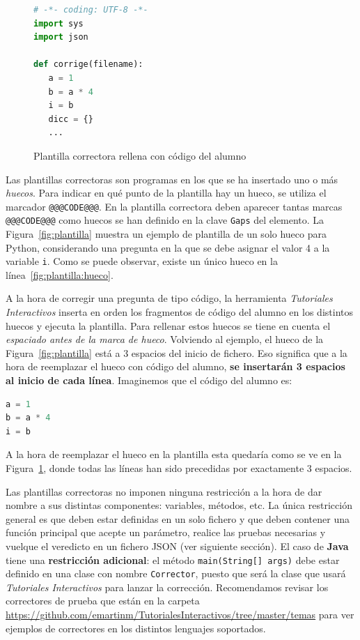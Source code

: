 \documentclass[]{article}
\newcommand{\code}[1]{{\lstinline[basicstyle=\ttfamily,mathescape]!#1!}}
\newcommand{\toolname}{\emph{Tutoriales Interactivos}}
\begin{document}
\begin{figure}[tb]
\begin{lstlisting}[language=Python,basicstyle=\ttfamily, otherkeywords={with}]
# -*- coding: UTF-8 -*-
import sys
import json
	
def corrige(filename):
   a = 1
   b = a * 4
   i = b
   dicc = {}
   ...
\end{lstlisting}	
\caption{Plantilla correctora rellena con código del alumno\label{fig:plantillaRellena}}
\end{figure}

Las plantillas correctoras son programas en los que se ha insertado uno o más \emph{huecos}. Para indicar en qué punto de la plantilla hay un hueco, se utiliza el marcador \code{@@@CODE@@@}. En la plantilla correctora deben aparecer tantas marcas \code{@@@CODE@@@} como huecos se han definido en la clave \code{Gaps} del elemento. La Figura~\ref{fig:plantilla} muestra un ejemplo de plantilla de un solo hueco para Python, considerando una pregunta en la que se debe asignar el valor 4 a la variable \code{i}. Como se puede observar, existe un único hueco en la línea~\ref{fig:plantilla:hueco}.

A la hora de corregir una pregunta de tipo código, la herramienta \toolname{} inserta en orden los fragmentos de código del alumno en los distintos huecos y ejecuta la plantilla. Para rellenar estos huecos se tiene en cuenta el \emph{espaciado antes de la marca de hueco}. Volviendo al ejemplo, el hueco de la Figura~\ref{fig:plantilla} está a 3 espacios del inicio de fichero. Eso significa que a la hora de reemplazar el hueco con código del alumno, \textbf{se insertarán 3 espacios al inicio de cada línea}. Imaginemos que el código del alumno es:
\begin{lstlisting}[language=Python,basicstyle=\ttfamily, otherkeywords={with}]
a = 1
b = a * 4
i = b
\end{lstlisting}
A la hora de reemplazar el hueco en la plantilla esta quedaría como se ve en la Figura~\ref{fig:plantillaRellena}, donde todas las líneas han sido precedidas por exactamente 3 espacios.

Las plantillas correctoras no imponen ninguna restricción a la hora de dar nombre a sus distintas componentes: variables, métodos, etc. La única restricción general es que deben estar definidas en un solo fichero y que deben contener una función principal que acepte un parámetro, realice las pruebas necesarias y vuelque el veredicto en un fichero JSON (ver siguiente sección). El caso de \textbf{Java} tiene una \textbf{restricción adicional}: el método \code{main(String[] args)} debe estar definido en una clase con nombre \code{Corrector}, puesto que será la clase que usará \toolname{} para lanzar la corrección. Recomendamos revisar los correctores de prueba que están en la carpeta \url{https://github.com/emartinm/TutorialesInteractivos/tree/master/temas} para ver ejemplos de correctores en los distintos lenguajes soportados.
\end{document}
